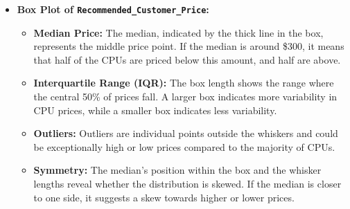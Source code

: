 \documentclass{article}
\begin{document}
\begin{itemize}
\begin{itemize}
			\item \textbf{Box Plot of \texttt{Recommended\_Customer\_Price}:}
			\begin{itemize}
				\item \textbf{Median Price:} 
				The median, indicated by the thick line in the box, represents the middle price point. If the median is around \$300, it means that half of the CPUs are priced below this amount, and half are above.
				\item \textbf{Interquartile Range (IQR):} 
				The box length shows the range where the central 50\% of prices fall. A larger box indicates more variability in CPU prices, while a smaller box indicates less variability.
				\item \textbf{Outliers:} 
				Outliers are individual points outside the whiskers and could be exceptionally high or low prices compared to the majority of CPUs.
				\item \textbf{Symmetry:} 
				The median's position within the box and the whisker lengths reveal whether the distribution is skewed. If the median is closer to one side, it suggests a skew towards higher or lower prices.
			\end{itemize}
		\end{itemize}
	\end{itemize}
\end{document}
